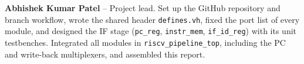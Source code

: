 \textbf{Abhishek Kumar Patel} -- Project lead. Set up the GitHub repository
and branch workflow, wrote the shared header \texttt{defines.vh}, fixed the port list of every
module, and designed the IF stage
(\texttt{pc\_reg}, \texttt{instr\_mem}, \texttt{if\_id\_reg}) with its unit testbenches.
Integrated all modules in \texttt{riscv\_pipeline\_top}, including the PC and write-back
multiplexers, and assembled this report.

